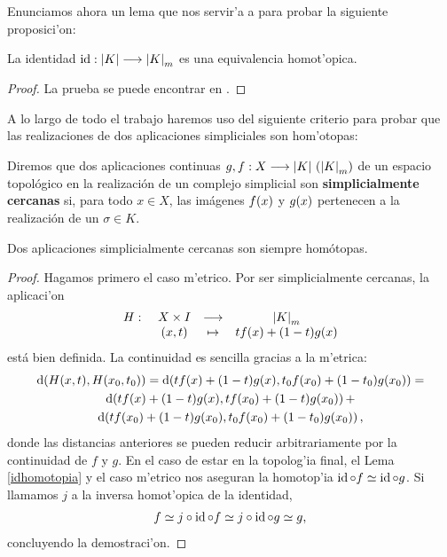 Enunciamos ahora un lema que nos servir'a a para probar la siguiente proposici'on:
\begin{lemma}\label{idhomotopia}
    La identidad $\operatorname{id} : \abs{K}\longrightarrow \abs{K}_m$ es una equivalencia homot'opica.
\end{lemma}
\begin{proof}
    La prueba se puede encontrar en \cite[p. 302]{mardešić1982shape}.
\end{proof}

A lo largo de todo el trabajo haremos uso del siguiente criterio para probar que las realizaciones de dos aplicaciones simpliciales son hom'otopas:
\begin{definition}
  Diremos que dos aplicaciones continuas $ g,f: X \longrightarrow \abs{K } \ (\abs{K}_m) $ de un espacio topológico en la realización de un complejo simplicial son \textbf{simplicialmente cercanas} si, para todo $ x\in X  $, las imágenes $ f(x) $ y $ g(x)  $ pertenecen a la realización de un $ \sigma \in K  $.
\end{definition}
\begin{proposition}\label{simplicialmentecercanas}
  Dos aplicaciones simplicialmente cercanas son siempre homótopas.
\end{proposition}
\begin{proof}
  Hagamos primero el caso m'etrico. Por ser simplicialmente cercanas, la aplicaci'on
  \begin{gather*}
    \begin{matrix}
    H: \ &X \times I &\longrightarrow &\abs{K}_m \\
    &(x,t) &\mapsto &tf(x) +(1-t)g(x)
    \end{matrix}
  \end{gather*}
  está bien definida. La continuidad es sencilla gracias a la m'etrica:
  \begin{gather*}
      \dd(H(x,t),H(x_0,t_0)) = \dd(tf(x)+(1-t)g(x), t_0f(x_0)+(1-t_0)g(x_0)) = \\ 
      \dd(tf(x)+(1-t)g(x),tf(x_0)+(1-t)g(x_0)) +\\ 
      \dd(tf(x_0)+(1-t)g(x_0),t_0f(x_0)+(1-t_0)g(x_0)), 
  \end{gather*}
   donde las distancias anteriores se pueden reducir arbitrariamente por la continuidad de $f$ y $g$. En el caso de estar en la topolog'ia final, el Lema \ref{idhomotopia} y el caso m'etrico nos aseguran la homotop'ia $\operatorname{id} \circ f\simeq \operatorname{id} \circ g$. Si llamamos $j$ a la inversa homot'opica de la identidad, 
   \begin{gather*}
       f\simeq j\circ \operatorname{id}\circ  f\simeq j \circ \operatorname{id} \circ g \simeq g,
   \end{gather*}
   concluyendo la demostraci'on.
\end{proof}


